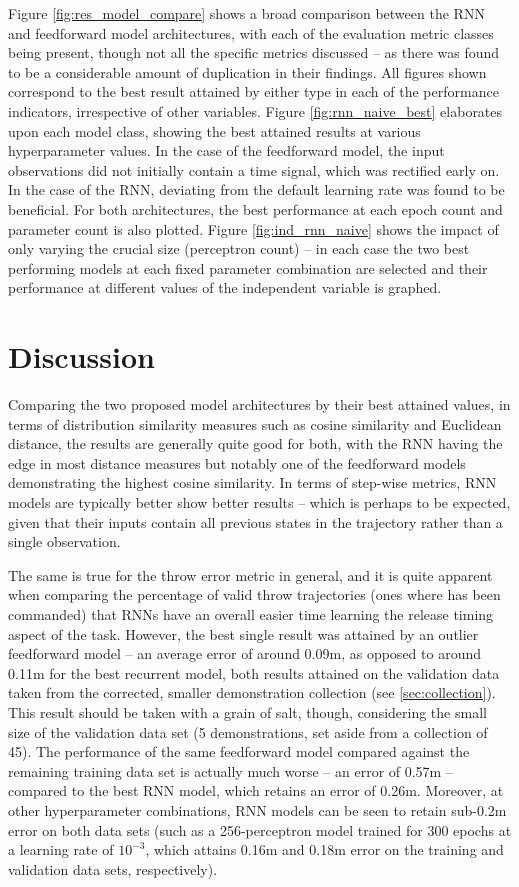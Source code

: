 \documentclass{article}
\begin{document}
Figure \ref{fig:res_model_compare} shows a broad comparison between the RNN and feedforward model architectures, with each of the evaluation metric classes being present, though not all the specific metrics discussed -- as there was found to be a considerable amount of duplication in their findings. All figures shown correspond to the best result attained by either type in each of the performance indicators, irrespective of other variables. Figure \ref{fig:rnn_naive_best} elaborates upon each model class, showing the best attained results at various hyperparameter values. In the case of the feedforward model, the input observations did not initially contain a time signal, which was rectified early on. In the case of the RNN, deviating from the default learning rate was found to be beneficial. For both architectures, the best performance at each epoch count and parameter count is also plotted. Figure \ref{fig:ind_rnn_naive} shows the impact of only varying the crucial size (perceptron count) -- in each case the two best performing models at each fixed parameter combination are selected and their performance at different values of the independent variable is graphed. 

\section{Discussion}

Comparing the two proposed model architectures by their best attained values, in terms of distribution similarity measures such as cosine similarity and Euclidean distance, the results are generally quite good for both, with the RNN having the edge in most distance measures but notably one of the feedforward models demonstrating the highest cosine similarity. In terms of step-wise metrics, RNN models are typically better show better results -- which is perhaps to be expected, given that their inputs contain all previous states in the trajectory rather than a single observation. 

The same is true for the throw error metric in general, and it is quite apparent when comparing the percentage of valid throw trajectories (ones where has been commanded) that RNNs have an overall easier time learning the release timing aspect of the task. However, the best single result was attained by an outlier feedforward model -- an average error of around 0.09m, as opposed to around 0.11m for the best recurrent model, both results attained on the validation data taken from the corrected, smaller demonstration collection (see \ref{sec:collection}). This result should be taken with a grain of salt, though, considering the small size of the validation data set (5 demonstrations, set aside from a collection of 45). The performance of the same feedforward model compared against the remaining training data set is actually much worse -- an error of 0.57m -- compared to the best RNN model, which retains an error of 0.26m. Moreover, at other hyperparameter combinations, RNN models can be seen to retain sub-0.2m error on both data sets (such as a 256-perceptron model trained for 300 epochs at a learning rate of $10^{-3}$, which attains 0.16m and 0.18m error on the training and validation data sets, respectively).
\end{document}
